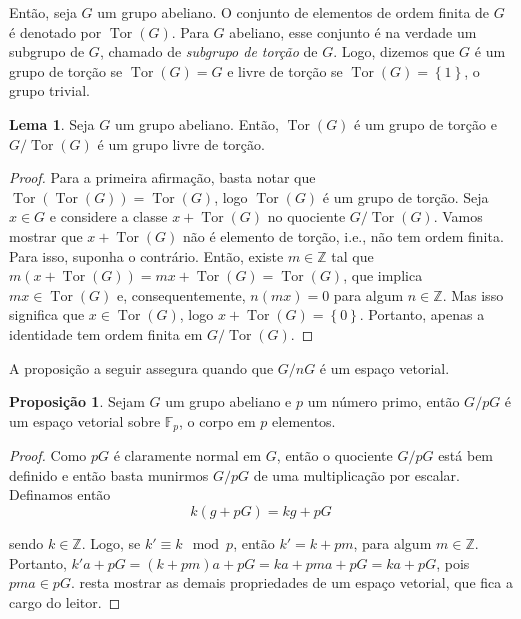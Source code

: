\documentclass[a4paper,portuguese,11pt,twoside, leqno]{book}
\DeclareMathOperator{\tor}{Tor}
\theoremstyle{definition}
\newtheorem{lemma}[theorem]{Lema}
\newtheorem{prop}{Proposição}[section]
\begin{document}
	\par\vspace{0.3cm} Então, seja $G$ um grupo abeliano. O conjunto de elementos de ordem finita de $G$ é denotado por $\tor(G)$. Para $G$ abeliano, esse conjunto é na verdade um subgrupo de $G$, chamado de \textit{subgrupo de torção} de $G$. Logo, dizemos que $G$ é um grupo de torção se $\tor(G) = G$ e livre de torção se $\tor(G) = \left\{1\right\}$, o grupo trivial.
	\begin{lemma}
		\label{quociente por tor}
		Seja $G$ um grupo abeliano. Então, $\tor(G)$ é um grupo de torção e $G/\tor(G)$ é um grupo livre de torção.
	\end{lemma}
	\begin{proof}
		Para a primeira afirmação, basta notar que $\tor(\tor(G)) = \tor(G)$, logo $\tor(G)$ é um grupo de torção. Seja $x\in G$ e considere a classe $x + \tor(G)$ no quociente $G/\tor(G)$. Vamos mostrar que $x + \tor(G)$ não é elemento de torção, i.e., não tem ordem finita. Para isso, suponha o contrário. Então, existe $m\in\mathbb{Z}$ tal que $m( x+\tor(G) ) = mx + \tor(G) = \tor(G)$, que implica $mx\in\tor(G)$ e, consequentemente, $n(mx) = 0$ para algum $n\in\mathbb{Z}$. Mas isso significa que $x\in\tor(G)$, logo $x+\tor(G) = \left\{0\right\}$. Portanto, apenas a identidade tem ordem finita em $G/\tor(G)$. 
	\end{proof}
	\par\vspace{0.3cm} A proposição a seguir assegura quando que $G/nG$ é um espaço vetorial.
	\begin{prop}
		\label{G/nG espaco vetorial}
		Sejam $G$ um grupo abeliano e $p$ um número primo, então $G/pG$ é um espaço vetorial sobre $\mathbb{F}_p$, o corpo em $p$ elementos.
	\end{prop}
	\begin{proof}
		Como $pG$ é claramente normal em $G$, então o quociente $G/pG$ está bem definido e então basta munirmos $G/pG$ de uma multiplicação por escalar. Definamos então
		\begin{equation*}
		k(g+pG)  = kg + pG
		\end{equation*}
		\par\vspace{0.3cm} sendo $k\in\mathbb{Z}$. Logo, se $k'\equiv k\mod p$, então $k' = k + pm$, para algum $m\in\mathbb{Z}$. Portanto, $k'a + pG = (k+pm)a + pG = ka + pma + pG = ka + pG$, pois $pma\in pG$. resta mostrar as demais propriedades de um espaço vetorial, que fica a cargo do leitor.
	\end{proof}
	
\end{document}
